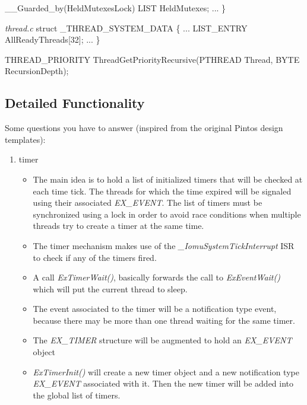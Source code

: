	__Guarded_by(HeldMutexesLock)
	LIST HeldMutexes;
	...
\}

\textit{thread.c}
struct _THREAD_SYSTEM_DATA \{
	...
	LIST_ENTRY AllReadyThreads[32];
	...
\}

THREAD_PRIORITY ThreadGetPriorityRecursive(PTHREAD Thread, BYTE RecursionDepth);


\subsection{Detailed Functionality}

Some questions you have to answer (inspired from the original Pintos design templates):
\begin{enumerate}
    \item timer
        \begin{itemize}
            \item The main idea is to hold a list of initialized timers that will be checked at each time tick. The threads for which the time expired
            will be signaled using their associated \textit{EX_EVENT}. The list of timers must be synchronized using a lock in order to avoid race conditions
            when multiple threads try to create a timer at the same time.
            \item The timer mechanism makes use of the \textit{_IomuSystemTickInterrupt} ISR to check if any of the timers fired.
            \item A call \textit{ExTimerWait()}, basically forwards the call to \textit{ExEventWait()} which will put the current thread to sleep.
            \item The event associated to the timer will be a notification type event, because there may be more than one thread waiting for the same timer.

            \item The \textit{EX_TIMER} structure will be augmented to hold an \textit{EX_EVENT} object 
            \item \textit{ExTimerInit()} will create a new timer object and a new notification type \textit{EX_EVENT} associated with it. Then the new
            timer will be added into the global list of timers.
        \end{itemize}
    

\end{enumerate}
